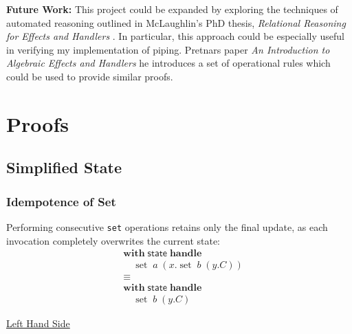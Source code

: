 \documentclass[logo,bsc,singlespacing,parskip]{infthesis}
\begin{document}
\textbf{Future Work: } This project could be expanded by exploring the techniques of automated reasoning outlined in McLaughlin's PhD thesis, \textit{Relational Reasoning for Effects and Handlers
} \cite{McLaughlin2020}. In particular, this approach could be especially useful in verifying my implementation of piping. Pretnars paper \textit{An Introduction to
Algebraic Effects and Handlers} \cite{pretnar_introduction_2015} he introduces a set of operational rules which could be used to provide similar proofs. 

% 




\appendix

\chapter{Proofs} 

\section{Simplified State} \label{full-simplified-single-cell-state-proof}

\subsection{Idempotence of Set}
Performing consecutive \lstinline{set} operations retains only the final update, as each invocation completely overwrites the current state:
\[
\begin{aligned}
    &\mathsf{\textbf{with}} \; \mathsf{state} \; \mathsf{\textbf{handle}} \\
    &\quad \operatorname{set} \; a \; (x. \operatorname{set} \; b \; (y. C)) \\
    &\equiv \\
    &\mathsf{\textbf{with}} \; \mathsf{state} \; \mathsf{\textbf{handle}} \\
    &\quad \operatorname{set} \; b \; (y. C)
\end{aligned}
\]

\underline{Left Hand Side}
\end{document}
